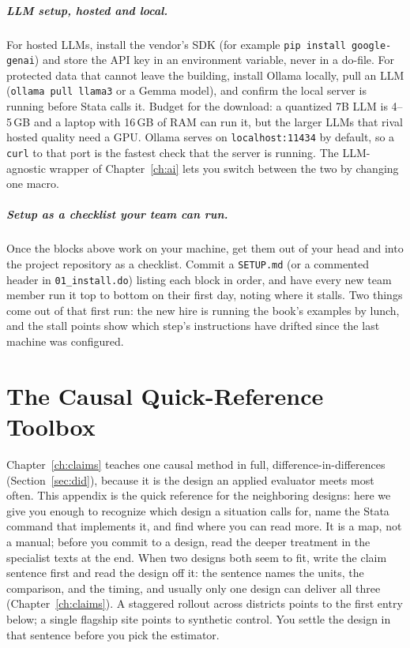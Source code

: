 \documentclass[
    a4paper,
    fontsize=10pt,
    twoside=true,
    numbers=noenddot,
]{kaobook}
\begin{document}
\paragraph{LLM setup, hosted and local.} For hosted LLMs, install the vendor's SDK (for example \texttt{pip install google-genai}) and store the API key in an environment variable, never in a do-file. For protected data that cannot leave the building, install Ollama locally, pull an LLM (\texttt{ollama pull llama3} or a Gemma model), and confirm the local server is running before Stata calls it. Budget for the download: a quantized 7B LLM is 4--5\,GB and a laptop with 16\,GB of RAM can run it, but the larger LLMs that rival hosted quality need a GPU. Ollama serves on \texttt{localhost:11434} by default, so a \texttt{curl} to that port is the fastest check that the server is running. The LLM-agnostic wrapper of Chapter~\ref{ch:ai} lets you switch between the two by changing one macro.

\paragraph{Setup as a checklist your team can run.} Once the blocks above work on your machine, get them out of your head and into the project repository as a checklist. Commit a \texttt{SETUP.md} (or a commented header in \texttt{01\_install.do}) listing each block in order, and have every new team member run it top to bottom on their first day, noting where it stalls. Two things come out of that first run: the new hire is running the book's examples by lunch, and the stall points show which step's instructions have drifted since the last machine was configured.

\chapter{The Causal Quick-Reference Toolbox}\label{app:causal}
Chapter~\ref{ch:claims} teaches one causal method in full, difference-in-differences (Section~\ref{sec:did}), because it is the design an applied evaluator meets most often. This appendix is the quick reference for the neighboring designs: here we give you enough to recognize which design a situation calls for, name the Stata command that implements it, and find where you can read more. It is a map, not a manual; before you commit to a design, read the deeper treatment in the specialist texts at the end. When two designs both seem to fit, write the claim sentence first and read the design off it: the sentence names the units, the comparison, and the timing, and usually only one design can deliver all three (Chapter~\ref{ch:claims}). A staggered rollout across districts points to the first entry below; a single flagship site points to synthetic control. You settle the design in that sentence before you pick the estimator.
\end{document}
